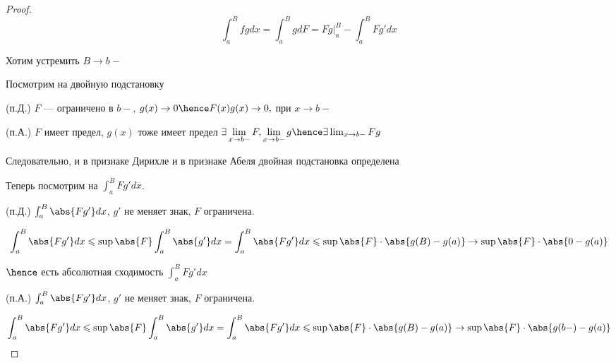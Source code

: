 \begin{proof}
    \[
        \int_a^B fg dx = \int_a^B g dF = Fg \bigg| _a ^ B - \int_a^B F g' dx 
    \]

    Хотим устремить $B \to b-$
    
    Посмотрим на двойную подстановку
    
    (п.Д.) $F$ --- ограничено в $b-$, $g(x) \to 0 \hence F(x)g(x) \to 0, $ при $x \to b-$

    (п.А.) $F$ имеет предел, $g(x)$ тоже имеет предел $\exists \lim\limits_{x \to b-} F, \lim\limits_{x  \to b-} g \hence \exists \lim_{x\to b-} Fg$

    Следовательно, и в признаке Дирихле и в признаке Абеля двойная подстановка определена

    Теперь посмотрим на $\int_a^B Fg' dx$.

    (п.Д.) $\int_a^B \abs{Fg'} dx$, $g'$ не меняет знак, $F$ ограничена.

    \[
        \int_a^B \abs{Fg'} dx \leqslant \sup \abs{F} \int_a^B \abs{g'} dx = \int_a^B \abs{Fg'} dx \leqslant \sup \abs{F} \cdot \abs{g(B) - g(a)} \to \sup \abs{F} \cdot \abs{0 - g(a)}
    \]

    $\hence $ есть абсолютная сходимость $\int_a^B Fg' dx$

    (п.А.) $\int_a^B \abs{Fg'} dx$, $g'$ не меняет знак, $F$ ограничена.


    \[
        \int_a^B \abs{Fg'} dx \leqslant \sup \abs{F} \int_a^B \abs{g'} dx = \int_a^B \abs{Fg'} dx \leqslant \sup \abs{F} \cdot \abs{g(B) - g(a)} \to \sup \abs{F} \cdot \abs{g(b-) - g(a)}
    \]

\end{proof}


